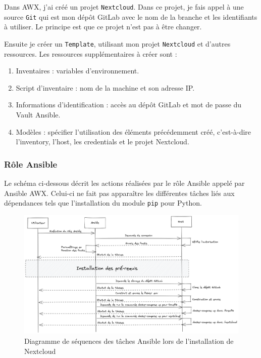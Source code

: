 \documentclass[12pt]{article}
\begin{document}
Dans AWX, j'ai créé un projet \verb|Nextcloud|. 
Dans ce projet, je fais appel à une source \verb|Git| qui est mon dépôt GitLab avec le nom de la branche et les identifiants à utiliser. 
Le principe est que ce projet n'est pas à être changer.

Ensuite je créer un \verb|Template|, utilisant mon projet \verb|Nextcloud| et d'autres ressources. 
Les ressources supplémentaires à créer sont :
\begin{enumerate}
    \item Inventaires : variables d'environnement. 
    \item Script d'inventaire : nom de la machine et son adresse IP.
    \item Informations d'identification : accès au dépôt GitLab et mot de passe du Vault Ansible.
    \item Modèles : spécifier l'utilisation des éléments précédemment créé, c'est-à-dire l'inventory, l'host, les credentials et le projet Nextcloud.
\end{enumerate}

\subsubsection{Rôle Ansible}
Le schéma ci-dessous décrit les actions réalisées par le rôle Ansible appelé par Ansible AWX. 
Celui-ci ne fait pas apparaître les différentes tâches liés aux dépendances tels que l'installation du module \verb|pip| pour Python.

\begin{figure}[!ht]
    \centering
    \includegraphics[width=\textwidth]{src/ansible_nextcloud.png}
    \caption{Diagramme de séquences des tâches Ansible lors de l'installation de Nextcloud}
    \label{fig:nextcloud_ansible}
\end{figure}
\end{document}
